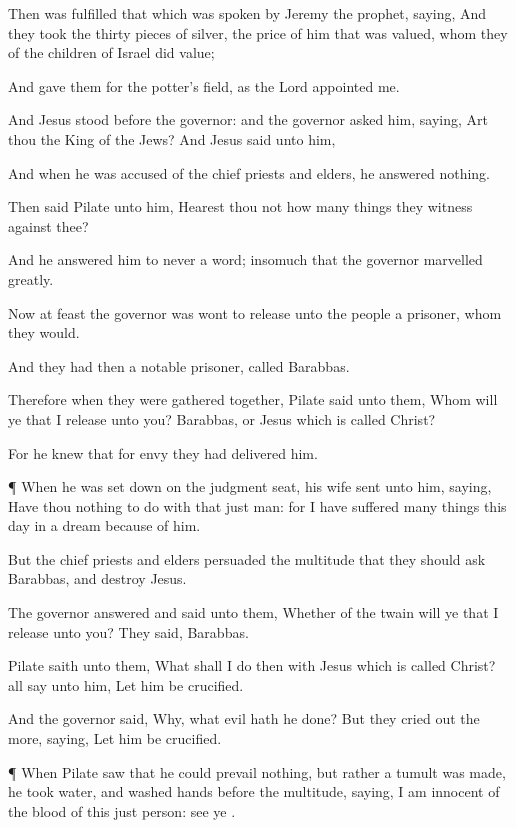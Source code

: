{Then was
fulfilled that which was
spoken
by
Jeremy the
prophet,
saying,
And they
took
the
thirty pieces of
silver, the
price of him that was
valued,
whom they of the
children
of
Israel did
value;

And
gave
them
for
the
potter’s
field,
as the
Lord
appointed
me.

And
Jesus
stood
before the
governor:
and the
governor
asked
him,
saying,
Art
thou the
King of the
Jews?
And
Jesus
said unto
him,
{}

And
when
he was
accused
of the chief
priests
and
elders, he
answered
nothing.

Then
said
Pilate unto
him, Hearest
thou
not how many
things they witness
against
thee?

And he
answered
him
to
never
a
word; insomuch
that the
governor
marvelled
greatly.

Now
at
{}
feast the
governor was
wont to
release
unto the
people a
prisoner,
whom they
would.

And they
had
then a
notable
prisoner,
called
Barabbas.

Therefore
when
they were gathered
together,
Pilate
said unto
them,
Whom will
ye that I
release unto
you?
Barabbas,
or
Jesus which is
called
Christ?

For he
knew
that
for
envy they had
delivered
him.


\par }{\PP {}¶
When
he was set
down
on the judgment
seat,
his
wife
sent
unto
him,
saying,
Have
thou nothing to
do
with
that just
man:
for I have
suffered many
things this
day
in a
dream because
of
him.

But the chief
priests
and
elders
persuaded the
multitude
that they should
ask
Barabbas,
and
destroy
Jesus.

The
governor
answered
and
said unto
them,
Whether
of the
twain will
ye that I
release unto
you?
They
said,
Barabbas.

Pilate
saith unto
them,
What shall I
do
then with
Jesus which is
called
Christ?
{}
all say
unto
him, Let him be
crucified.

And the
governor
said,
Why,
what
evil hath he
done?
But
they cried
out the
more,
saying, Let him be
crucified.


\par }{\PP {}¶
When
Pilate
saw
that he could
prevail
nothing,
but
{}
rather a
tumult was
made, he
took
water, and
washed
{}
hands
before the
multitude,
saying, I
am
innocent
of the
blood of
this just
person:
see
ye
{}.

}
